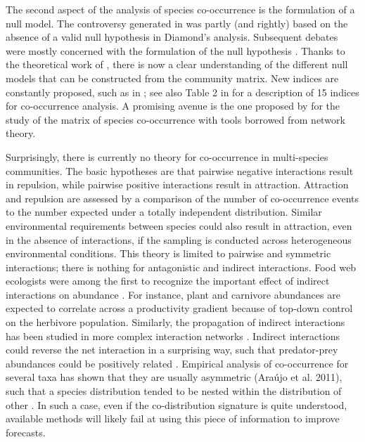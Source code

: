 The second aspect of the analysis of species co-occurrence is the formulation of a null model. The controversy generated in \citep{Connor1979} was partly (and rightly) based on the absence of a valid null hypothesis in Diamond’s analysis. Subsequent debates were mostly concerned with the formulation of the null hypothesis \citep[\textit{e.g.},][]{Diamond1982}. Thanks to the theoretical work of
\cite{Gotelli1996}, there is now a clear understanding of the different
null models that can be constructed from the community matrix. New indices are
constantly proposed, such as in \citep{Boulangeat2012, Veech2013}; see also Table 2 in \citep{Ulrich2013} for a description of 15 indices for co-occurrence analysis. A promising avenue is the one proposed by
\cite{Araujo2011} for the study of the matrix of species co-occurrence
with tools borrowed from network theory.

Surprisingly, there is currently no theory for co-occurrence in multi-species communities. The basic hypotheses are that pairwise negative interactions result in repulsion, while pairwise positive interactions result in attraction. Attraction and repulsion are assessed by a comparison of the number of co-occurrence events to the number expected under a totally independent distribution. Similar environmental requirements between species could also result in attraction, even in the absence of interactions, if the sampling is conducted across heterogeneous environmental conditions. This theory is limited to pairwise and symmetric interactions; there is nothing for antagonistic and indirect interactions. Food web ecologists were among the first to recognize the important effect of indirect interactions on abundance
\citep{Wootton1994}. For instance, plant and carnivore abundances are expected to correlate across a productivity gradient
\citep{Hairston1960, Oksanen1981} because of top-down control on the herbivore population. Similarly, the propagation of indirect interactions has been studied in more complex interaction networks \citep{Yodzis1988}. Indirect interactions could reverse the net interaction in a surprising way, such that predator-prey abundances could be positively related \citep{Montoya2009}. Empirical analysis of co-occurrence for several taxa has shown that they are usually asymmetric (Araújo et al. 2011), such that a species distribution tended to be nested within the distribution of other \citep[\textit{e.g.} predator-prey distributions][]{Holt2009, Gravel2011}. In such a case, even if the co-distribution signature is quite understood, available methods will likely fail at using this piece of information to improve forecasts.


